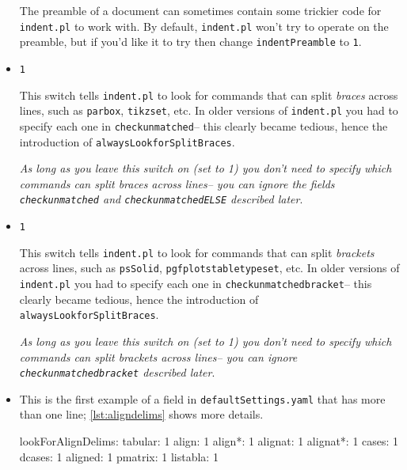 \begin{itemize}
 		The preamble of a document can sometimes contain some trickier code 
 		for \lstinline!indent.pl! to work with. By default, \lstinline!indent.pl!
 		won't try to operate on the preamble, but if you'd like it to try then 
 		change \lstinline!indentPreamble! to \lstinline!1!.
 		\item[\verbitem{alwaysLookforSplitBraces}] \lstinline!1!
 		 		 		 		 					
 		This switch tells \lstinline!indent.pl! to look for commands that 
 		can split \emph{braces} across lines, such as \lstinline!parbox!, \lstinline!tikzset!, etc. In older
 		versions of \lstinline!indent.pl! you had to specify each one in \lstinline!checkunmatched!-- this 
 		clearly became tedious, hence the introduction of \lstinline!alwaysLookforSplitBraces!. 
 		 		 		 		 					
 		\emph{As long as you leave this switch on (set to 1) you don't need to specify which 
 			commands can split braces across lines-- you can ignore the 
 			fields \lstinline!checkunmatched! and \lstinline!checkunmatchedELSE! described later}.
 		\item[\verbitem{alwaysLookforSplitBrackets}] \lstinline!1!
 		 		 		 		 					
 		This switch tells \lstinline!indent.pl! to look for commands that 
 		can split \emph{brackets} across lines, such as \lstinline!psSolid!, \lstinline!pgfplotstabletypeset!, 
 		etc. In older versions of \lstinline!indent.pl! you had to specify each one in \lstinline!checkunmatchedbracket!-- 
 		this clearly became tedious, hence the introduction of \lstinline!alwaysLookforSplitBraces!. 
 		 		 		 		 					
 		\emph{As long as you leave this switch on (set to 1) you don't need to specify which 
 			commands can split brackets across lines-- you can ignore \lstinline!checkunmatchedbracket! described later}.
 		 		 		 		 					
 		\item[\verbitem{lookForAlignDelims}] This is the first example of a field
 		in \lstinline!defaultSettings.yaml! that has more than one line; \cref{lst:aligndelims}
 		shows more details.
 		 		 		 		 					
 		\begin{yaml}[caption={\lstinline!lookForAlignDelims!},label={lst:aligndelims}]
lookForAlignDelims:
   tabular: 1
   align: 1
   align*: 1
   alignat: 1
   alignat*: 1
   cases: 1
   dcases: 1
   aligned: 1
   pmatrix: 1
   listabla: 1
 		\end{yaml}
 		 		 		 		 					

\end{itemize}
